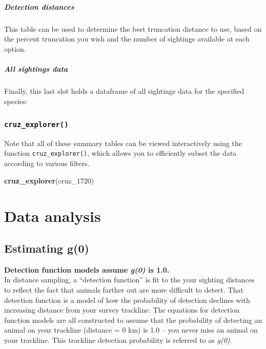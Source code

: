 \documentclass[
]{book}
\newenvironment{Shaded}{\begin{snugshade}}{\end{snugshade}}
\newcommand{\FunctionTok}[1]{\textcolor[rgb]{0.13,0.29,0.53}{\textbf{#1}}}
\newcommand{\NormalTok}[1]{#1}
\begin{document}
\hypertarget{detection-distances}{%
\subsubsection*{Detection distances}\label{detection-distances}}

This table can be used to determine the best truncation distance to use, based on the
percent truncation you wish and the number of sightings available at each option.

\hypertarget{all-sightings-data}{%
\subsubsection*{All sightings data}\label{all-sightings-data}}

Finally, this last slot holds a dataframe of all sightings data for the specified species:

\hypertarget{cruz_explorer}{%
\section*{\texorpdfstring{\texttt{cruz\_explorer()}}{cruz\_explorer()}}\label{cruz_explorer}}

Note that all of these summary tables can be viewed interactively using the function \texttt{cruz\_explorer()},
which allows you to efficiently subset the data according to various filters.

\begin{Shaded}
\begin{Highlighting}[]
\FunctionTok{cruz\_explorer}\NormalTok{(cruz\_1720)}
\end{Highlighting}
\end{Shaded}

\hypertarget{part-data-analysis}{%
\part{Data analysis}\label{part-data-analysis}}

\hypertarget{g0}{%
\chapter{Estimating g(0)}\label{g0}}

\textbf{Detection function models assume \emph{g(0)} is 1.0.}\\
In distance sampling, a ``detection function'' is fit to the your sighting distances to reflect the fact that animals farther out are more difficult to detect. That detection function is a model of how the probability of detection declines with increasing distance from your survey trackline. The equations for detection function models are all constructed to assume that the probability of detecting an animal on your trackline (distance = 0 km) is 1.0 -- you never miss an animal on your trackline. This trackline detection probability is referred to as \emph{g(0)}.
\end{document}
